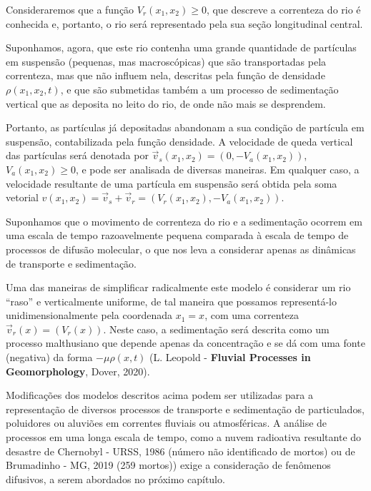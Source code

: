 Consideraremos que a função \(V_r(x_1, x_2) \ge 0\), que descreve a correnteza do rio é conhecida e, portanto, o rio será representado pela sua seção longitudinal central.

Suponhamos, agora, que este rio contenha uma grande quantidade de partículas em suspensão (pequenas, mas macroscópicas) que são transportadas pela correnteza, mas que não influem nela, descritas pela função de densidade \(\rho(x_1, x_2, t)\), e que são submetidas também a um processo de sedimentação vertical que as deposita no leito do rio, de onde não mais se desprendem.

Portanto, as partículas já depositadas abandonam a sua condição de partícula em suspensão, contabilizada pela função densidade. A velocidade de queda vertical das partículas será denotada por \(\vec{v}_s(x_1, x_2) = (0, -V_a(x_1, x_2))\), \(V_a(x_1, x_2) \ge 0\), e pode ser analisada de diversas maneiras. Em qualquer caso, a velocidade resultante de uma partícula em suspensão será obtida pela soma vetorial \(v(x_1, x_2) = \vec{v}_s + \vec{v}_r = (V_r(x_1, x_2), -V_a(x_1, x_2))\).

Suponhamos que o movimento de correnteza do rio e a sedimentação ocorrem em uma escala de tempo razoavelmente pequena comparada à escala de tempo de processos de difusão molecular, o que nos leva a considerar apenas as dinâmicas de transporte e sedimentação.

Uma das maneiras de simplificar radicalmente este modelo é considerar um rio ``raso'' e verticalmente uniforme, de tal maneira que possamos representá-lo unidimensionalmente pela coordenada \(x_1 = x\), com uma correnteza \(\vec{v}_r(x) = (V_r(x))\). Neste caso, a sedimentação será descrita como um processo malthusiano que depende apenas da concentração e se dá com uma fonte (negativa) da forma \(-\mu\rho(x,t)\) (L. Leopold - \textbf{Fluvial Processes in Geomorphology}, Dover, 2020).

Modificações dos modelos descritos acima podem ser utilizadas para a representação de diversos processos de transporte e sedimentação de particulados, poluidores ou aluviões em correntes fluviais ou atmosféricas. A análise de processos em uma longa escala de tempo, como a nuvem radioativa resultante do desastre de Chernobyl - URSS, 1986 (número não identificado de mortos) ou de Brumadinho - MG, 2019 (259 mortos)) exige a consideração de fenômenos difusivos, a serem abordados no próximo capítulo.

